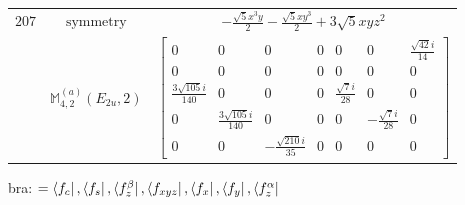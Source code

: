 \documentclass[fleqn,8pt,landscape]{jsarticle}
\begin{document}
\begin{longtable}{ccc}
$ 207 $ & $ \text{symmetry} $ & $ - \frac{\sqrt{5} x^{3} y}{2} - \frac{\sqrt{5} x y^{3}}{2} + 3 \sqrt{5} x y z^{2} $ \\
$  $ & $ \mathbb{M}_{4,2}^{(a)}(E_{2u},2) $ & $ \begin{bmatrix} 0 & 0 & 0 & 0 & 0 & 0 & \frac{\sqrt{42} i}{14} \\ 0 & 0 & 0 & 0 & 0 & 0 & 0 \\ \frac{3 \sqrt{105} i}{140} & 0 & 0 & 0 & \frac{\sqrt{7} i}{28} & 0 & 0 \\ 0 & \frac{3 \sqrt{105} i}{140} & 0 & 0 & 0 & - \frac{\sqrt{7} i}{28} & 0 \\ 0 & 0 & - \frac{\sqrt{210} i}{35} & 0 & 0 & 0 & 0 \end{bmatrix} $ \\ \hline
\end{longtable}
bra: $=\bra{f_{c}}, \bra{f_{s}}, \bra{f_{z}^{\beta}}, \bra{f_{xyz}}, \bra{f_{x}}, \bra{f_{y}}, \bra{f_{z}^{\alpha}}$
\end{document}
